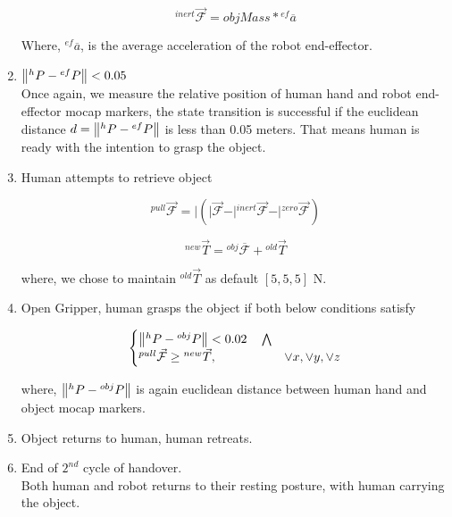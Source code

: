 \documentclass[a4paper, 12pt, oneside]{Thesis}  %
\begin{document}
\begin{enumerate}[start=0,label={\bf{t}\arabic*:}]
    \begin{equation}
        {}^{inert}\vec{\mathcal{F}}  = objMass * {}^{ef}\overline{a}
    \end{equation}

    Where, ${}^{ef}\overline{a}$, is the average acceleration of the robot end-effector.

    \item $\norm{{}^h{P} - {}^{ef}{P}} < 0.05$\\
    Once again, we measure the relative position of human hand and robot end-effector mocap markers, the state transition is successful if the euclidean distance $d = \norm{{}^h{P} - {}^{ef}{P}}$ is less than 0.05 meters. That means human is ready with the intention to grasp the object.
    
    \item Human attempts to retrieve object
    
    \begin{equation}
    {}^{pull}\vec{\mathcal{F}} = \vert{ (\vert{\vec{\mathcal{F}}} - \vert{{}^{inert}\vec{\mathcal{F}}} - \vert{{}^{zero}\vec{\mathcal{F}}}) }
    \end{equation}
    
    \begin{equation}
    {}^{new}\vec{T} = {}^{obj}\overline{\mathcal{F}} + {}^{old}\vec{T}
    \end{equation}
    
    where, we chose to maintain ${}^{old}\vec{T}$ as default $[5, 5, 5]$ N.
    
    \item Open Gripper, human grasps the object if both below conditions satisfy

    \begin{equation}
    \begin{cases}
     \norm{{}^h{P} - {}^{obj}{P}} < 0.02 \quad \bigwedge  \\
     {}^{pull}\vec{\mathcal{F}}\geq {}^{new}\vec{T}, & \lor x, \lor y, \lor z
   \end{cases}
   \end{equation}

    where, $\norm{{}^h{P} - {}^{obj}{P}}$ is again euclidean distance between human hand and object mocap markers.

    \item Object returns to human, human retreats.
    
    \item End of $2^{nd}$ cycle of handover.\\
    Both human and robot returns to their resting posture, with human carrying the object.
\end{enumerate}
    
\end{document}
